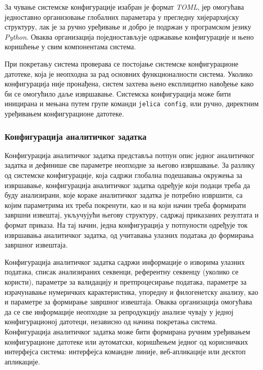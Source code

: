 \documentclass[12pt,oneside]{memoir}
\begin{document}
За чување системске конфигурације изабран је формат \textit{TOML}, јер омогућава једноставно организовање глобалних параметара у прегледну хијерархијску структуру, лак је за ручно уређивање и добро је подржан у програмском језику \textit{Python}. Оваква организација поједностављује одржавање конфигурације и њено коришћење у свим компонентама система.

При покретању система проверава се постојање системске конфигурационе датотеке, која је неопходна за рад основних функционалности система. Уколико конфигурација није пронађена, систем захтева њено експлицитно навођење како би се омогућило даље извршавање. Системска конфигурација може бити иницирана и мењана путем групе команди \texttt{jelica config}, или ручно, директним уређивањем конфигурационе датотеке.

\subsubsection{Конфигурација аналитичког задатка}
\label{sec:analytical-task-configuration}
Конфигурација аналитичког задатка представља потпун опис једног аналитичког задатка и дефинише све параметре неопходне за његово извршавање. За разлику од системске конфигурације, која садржи глобална подешавања окружења за извршавање, конфигурација аналитичког задатка одређује који подаци треба да буду анализирани, које кораке аналитичког задатка је потребно извршити, са којим параметрима их треба покренути, као и на који начин треба формирати завршни извештај, укључујући његову структуру, садржај приказаних резултата и формат приказа. На тај начин, једна конфигурација у потпуности одређује ток извршавања аналитичког задатка, од учитавања улазних података до формирања завршног извештаја.

Конфигурација аналитичког задатка садржи информације о изворима улазних података, списак анализираних секвенци, референтну секвенцу (уколико се користи), параметре за валидацију и претпроцесирање података, параметре за израчунавање нумеричких карактеристика, упоредну и филогенетску анализу, као и параметре за формирање завршног извештаја. Оваква организација омогућава да се све информације неопходне за репродукцију анализе чувају у једној конфигурационој датотеци, независно од начина покретања система. Конфигурација аналитичког задатка може бити формирана ручним уређивањем конфигурационе датотеке или аутоматски, коришћењем једног од корисничких интерфејса система: интерфејса командне линије, веб-апликације или десктоп апликације.
\end{document}
